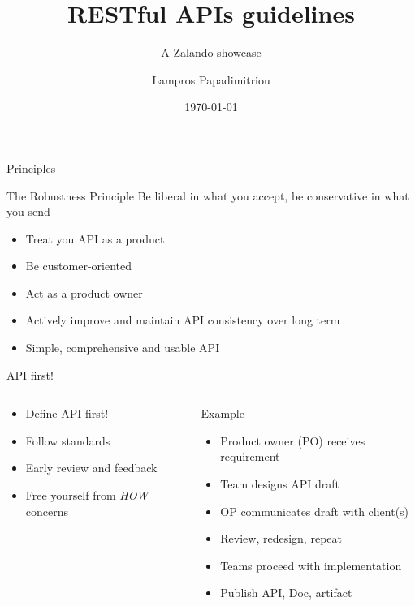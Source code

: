 \documentclass[10pt]{beamer}
\title{RESTful APIs guidelines}
\subtitle{A Zalando showcase}
\date{\today}
\author{Lampros Papadimitriou}
\institute{Check24 Baufinanzierung GmbH}
\begin{document}
\maketitle

\begin{frame}{Principles}

  \begin{alertblock}{The Robustness Principle}
    Be liberal in what you accept, be conservative in what you send
  \end{alertblock}

  \begin{itemize}
    \item Treat you API as a product
    \item Be customer-oriented
    \item Act as a product owner
    \item Actively improve and maintain API consistency over long term
    \item Simple, comprehensive and usable API
  \end{itemize}

\end{frame}

\begin{frame}{API first!}
  \begin{columns}
   	\begin{column}{0.4\textwidth}
	  \begin{itemize}
	    \item Define API first!
		\item Follow standards
		\item Early review and feedback
		\item Free yourself from \emph{HOW} concerns
	  \end{itemize}
   	\end{column}
    \begin{column}{0.6\textwidth}
    Example
   	\begin{itemize}
   		\item Product owner (PO) receives requirement
   		\item Team designs API draft
   		\item OP communicates draft with client(s)
   		\item Review, redesign, repeat
   		\item Teams proceed with implementation
   		\item Publish API, Doc, artifact
   	\end{itemize}
   \end{column}
  \end{columns}

\end{frame}
\end{document}

